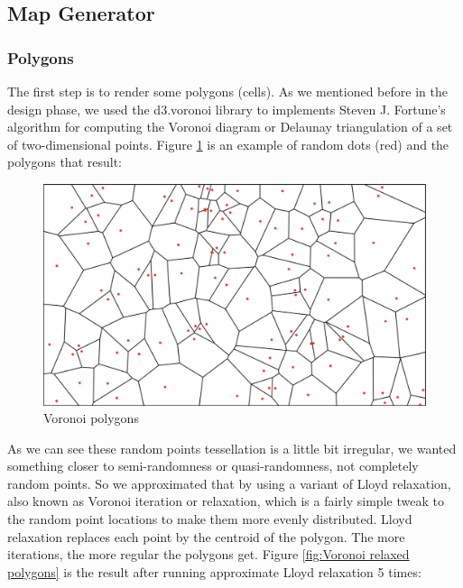 \subsection{Map Generator}
\subsubsection{Polygons}
The first step is to render some polygons (cells). As we mentioned before in the design phase, we used the d3.voronoi library to implements Steven J. Fortune’s algorithm for computing the Voronoi diagram or Delaunay triangulation of a set of two-dimensional points. Figure \ref{fig:Voronoi polygons} is an example of random dots (red) and the polygons that result:

\begin{figure}[htbp]
\centering
\includegraphics[width=\textwidth]{section04/assets/Map-voronoi.png}
\caption[Voronoi polygons]{\label{fig:Voronoi polygons}Voronoi polygons}
\end{figure}

As we can see these random points tessellation is a little bit irregular, we wanted something closer to semi-randomness or quasi-randomness, not completely random points. So we approximated that by using a variant of Lloyd relaxation, also known as Voronoi iteration or relaxation, which is a fairly simple tweak to the random point locations to make them more evenly distributed. Lloyd relaxation replaces each point by the centroid of the polygon. The more iterations, the more regular the polygons get. Figure \ref{fig:Voronoi relaxed polygons} is the result after running approximate Lloyd relaxation 5 times:

